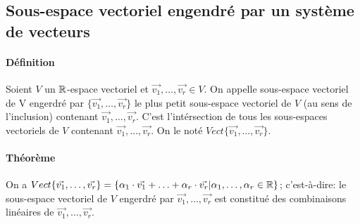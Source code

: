 %
\subsection{Sous-espace vectoriel engendré par un système de vecteurs}
%
\paragraph{Définition} Soient $V$ un $\mathbb{R}$-espace vectoriel et $\vec{v_1}, \ldots, \vec{v_r} \in V$. On appelle sous-espace vectoriel de V engerdré par $\{\vec{v_1}, \ldots, \vec{v_r}\}$ le plus petit sous-espace vectoriel de $V$ (au sens de l'inclusion) contenant $\vec{v_1}, \ldots, \vec{v_r}$. C'est l'intérsection de tous les sous-espaces vectoriels de $V$ contenant $\vec{v_1}, \ldots, \vec{v_r}$. On le noté $Vect\{\vec{v_1}, \ldots, \vec{v_r}\}$.

\paragraph{Théorème} On a $Vect\{\vec{v_1}, \ldots, \vec{v_r}\} = \{\alpha_1 \cdot \vec{v_1} + \ldots + \alpha_r \cdot \vec{v_r} | \alpha_1, \ldots, \alpha_r \in \mathbb{R} \}$; c'est-à-dire: le sous-espace vectoriel de $V$ engerdré par $\vec{v_1}, \ldots, \vec{v_r}$ est constitué des combinaisons linéaires de $\vec{v_1}, \ldots, \vec{v_r}$.
